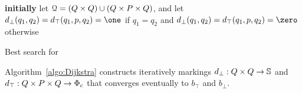 \begin{algorithm}

\textbf{initially} let $\mathcal{Q} = (Q \times Q) \cup (Q \times P \times Q)$, %
and let $d_\bot(q_1, q_2) = d_\top(q_1, p, q_2) = \one$
if $q_1 = q_2$ and $d_\bot(q_1, q_2) = d_\top(q_1, p, q_2) = \zero$ otherwise$\;$

\smallskip\noindent
{}
\caption{Best search for \SWVPA}
\label{algo:Dijkstra}
\end{algorithm}

Algorithm~\ref{algo:Dijkstra}
constructs iteratively markings
$d_\bot : Q \times Q \to \mathbb{S}$ and
$d_\top : Q \times P \times Q \to \Phic$
that converges eventually to $b_\top$ and $b_\bot$.


